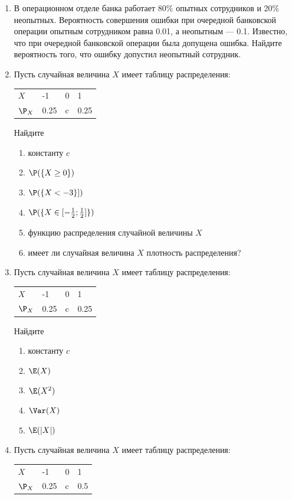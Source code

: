 \begin{enumerate}
\item  В операционном отделе банка работает 80\% опытных сотрудников и 20\%
неопытных. Вероятность совершения ошибки при очередной банковской операции
опытным сотрудником равна 0.01, а неопытным — 0.1. Известно, что при очередной банковской операции была допущена ошибка. Найдите вероятность того, что ошибку допустил неопытный сотрудник.

\item  Пусть случайная величина $X$ имеет таблицу распределения:

\begin{tabular}{ ll l l}
	\toprule
	$X$ & -1  & 0  & 1 \\
	$\P_X$ & 0.25  & c  & 0.25 \\
  \bottomrule
\end{tabular}

Найдите
	\begin{enumerate}
	\item константу $c$
	\item $\P(\{X \geq 0\})$
	\item $\P(\{X < -3\}])$
	\item $\P(\{X \in [-\frac{1}{2}; \frac{1}{2}]\})$
	\item функцию распределения случайной величины $X$
	\item имеет ли случайная величина $X$ плотность распределения?
	\end{enumerate}


\item  Пусть случайная величина $X$ имеет таблицу распределения:

\begin{tabular}{ llll}
\toprule
$X$ & -1  & 0  & 1 \\
$\P_X$ & 0.25  & c  & 0.25 \\
\bottomrule
\end{tabular}

Найдите
\begin{enumerate}
	\item константу $c$
	\item $\E(X)$
	\item $\E(X^2)$
	\item $\Var(X)$
	\item $\E(|X|)$
\end{enumerate}

\item  Пусть случайная величина $X$ имеет таблицу распределения:

\begin{tabular}{ lll l}
\toprule
$X$ & -1  & 0  & 1 \\
$\P_X$ & 0.25  & c  & 0.5 \\
\bottomrule
\end{tabular}


\end{enumerate}

